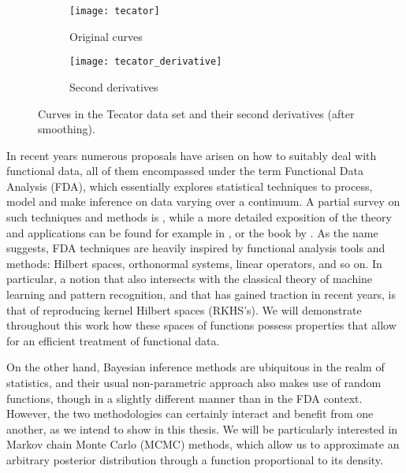\enlargethispage{1\baselineskip}

\begin{figure}[ht!]
  \begin{subfigure}[b]{0.48\textwidth}
    \texttt{[image: tecator]}
    \caption{Original curves}\label{fig:tecator_orig}
  \end{subfigure}
  \hfill
  \begin{subfigure}[b]{0.48\textwidth}
    \texttt{[image: tecator\_derivative]}
    \caption{Second derivatives}\label{fig:tecator_derivatives}
  \end{subfigure}
  \caption{Curves in the Tecator data set and their second derivatives (after smoothing).}\label{fig:tecator}
\end{figure}

In recent years numerous proposals have arisen on how to suitably deal with functional data, all of them encompassed under the term Functional Data Analysis (FDA), which essentially explores statistical techniques to process, model and make inference on data varying over a continuum. A partial survey on such techniques and methods is \citet{cuevas2014partial}, while a more detailed exposition of the theory and applications can be found for example in \citet{ramsay2005functional}, \citet{hsing2015theoretical} or the book by \citet{horvath2012inference}. As the name suggests, FDA techniques are heavily inspired by functional analysis tools and methods: Hilbert spaces, orthonormal systems, linear operators, and so on. In particular, a notion that also intersects with the classical theory of machine learning and pattern recognition, and that has gained traction in recent years, is that of reproducing kernel Hilbert spaces (RKHS's). We will demonstrate throughout this work how these spaces of functions possess properties that allow for an efficient treatment of functional data.

On the other hand, Bayesian inference methods are ubiquitous in the realm of statistics, and their usual non-parametric approach also makes use of random functions, though in a slightly different manner than in the FDA context. However, the two methodologies can certainly interact and benefit from one another, as we intend to show in this thesis. We will be particularly interested in Markov chain Monte Carlo (MCMC) methods, which allow us to approximate an arbitrary posterior distribution through a function proportional to its density.

\begin{center}
  \vspace{.25em}
\color{teal}\FourStar
\end{center}

